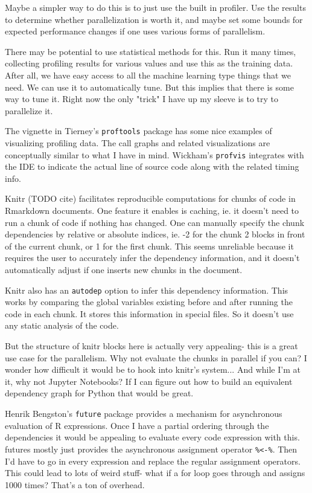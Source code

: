 \documentclass[12pt]{article}
\begin{document}
Maybe a simpler way to do this is to just use the built in profiler. Use
the results to determine whether parallelization is worth it, and maybe set
some bounds for expected performance changes if one uses various forms of
parallelism. 

There may be potential to use statistical methods for this.
Run it many times, collecting profiling results for various values and use
this as the training data. After all, we have easy access to all the
machine learning type things that we need. We can use it to automatically
tune. But this implies that there is some way to tune it. Right now the
only "trick" I have up my sleeve is to try to parallelize it.

The vignette in Tierney's \texttt{proftools} package has some nice examples
of visualizing profiling data. The call graphs and related visualizations
are conceptually similar to what I have in mind.
Wickham's \texttt{profvis} integrates with the IDE to indicate the actual
line of source code along with the related timing info.

Knitr (TODO cite) facilitates reproducible computations for
chunks of code in Rmarkdown documents. One feature it enables is caching,
ie. it doesn't need to run a chunk of code if nothing has changed. One can
manually specify the chunk dependencies by relative or absolute indices,
ie. -2 for the chunk 2 blocks in front of the current chunk, or 1 for the
first chunk. This seems unreliable because it requires the user to
accurately infer the dependency information, and it doesn't automatically
adjust if one inserts new chunks in the document.

Knitr also has an \texttt{autodep} option to infer this dependency
information. This works by comparing the global variables existing before
and after running the code in each chunk. It stores this information in
special files. So it doesn't use any static analysis of the code.

But the structure of knitr blocks here is actually very appealing- this is
a great use case for the parallelism. Why not evaluate the chunks in
parallel if you can? I wonder how difficult it would be to hook into
knitr's system... And while I'm at it, why not Jupyter Notebooks? If I can
figure out how to build an equivalent dependency graph for Python that
would be great.

Henrik Bengston's \texttt{future} package provides a mechanism for
asynchronous evaluation of R expressions. Once I have a partial ordering
through the dependencies it
would be appealing to evaluate every code expression with this. 
futures mostly just provides the asynchronous
assignment operator \texttt{\%<-\%}. Then I'd have to go in every
expression and replace the regular assignment operators. This could lead to
lots of weird stuff- what if a for loop goes through and assigns 1000
times? That's a ton of overhead.
\end{document}

